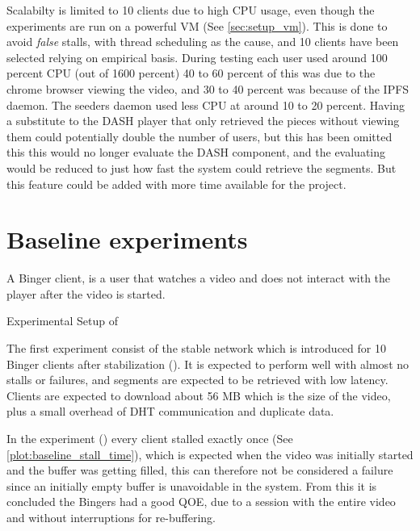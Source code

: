 Scalabilty is limited to 10 clients due to high CPU usage, even though the experiments are run on a powerful \ac{VM} (See \autoref{sec:setup_vm}). This is done to avoid \textit{false} stalls, with thread scheduling as the cause, and 10 clients have been selected relying on empirical basis. During testing each user used around 100 percent CPU (out of 1600 percent) 40 to 60 percent of this was due to the chrome browser viewing the video, and 30 to 40 percent was because of the \ac{IPFS} daemon. The seeders daemon used less CPU at around 10 to 20 percent. Having a substitute to the \ac{DASH} player that only retrieved the pieces without viewing them could potentially double the number of users, but this has been omitted this this would no longer evaluate the \ac{DASH} component, and the evaluating would be reduced to just how fast the system could retrieve the segments. But this feature could be added with more time available for the project.

\section{Baseline experiments}
\label{sec:eval_baseline}
A Binger client, is a user that watches a video and does not interact with the player after the video is started.

\begin{table}[!htbp]
    \myfloatalign
    \caption[Experimental Setup of Baseline]{Experimental Setup of }
    \label{tab:exp_overview_baseline}
    
\end{table}

The first experiment consist of the stable network which is introduced for 10 Binger clients after stabilization (). It is expected to perform well with almost no stalls or failures, and segments are expected to be retrieved with low latency. Clients are expected to download about 56 \ac{MB} which is the size of the video, plus a small overhead of \ac{DHT} communication and duplicate data.

In the experiment () every client stalled exactly once (See \autoref{plot:baseline_stall_time}), which is expected when the video was initially started and the buffer was getting filled, this can therefore not be considered a failure since an initially empty buffer is unavoidable in the system. From this it is concluded the Bingers had a good \ac{QOE}, due to a session with the entire video and without interruptions for re-buffering.

